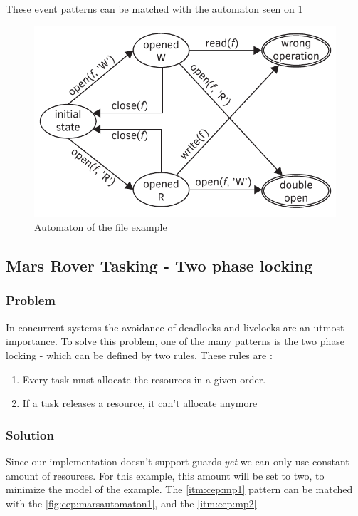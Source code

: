 				These event patterns can be matched with the automaton seen on \cref{fig:cep:fileautomaton}
				
				\begin{figure}[h]
				\centering
				\includegraphics[width=0.7\linewidth]{include/figures/chapter_5/file_example_aut}
				\caption{Automaton of the file example}
				\label{fig:cep:fileautomaton}
				\end{figure}

		
		
		\subsection{Mars Rover Tasking - Two phase locking}
			\subsubsection{Problem}
				In concurrent systems the avoidance of deadlocks and livelocks are an utmost importance.
				To solve this problem, one of the many patterns is  the two phase locking - which can be defined by two rules.
				These rules are : 
				\begin{enumerate}
					\item \label{itm:cep:mp1} Every task must allocate the resources in a given order.
					\item \label{itm:cep:mp2} If a task releases a resource, it can't allocate anymore
				\end{enumerate}
			\subsubsection{Solution}
				Since our implementation doesn't support guards \emph{yet} we can only use constant amount of resources.
				For this example, this amount will be set to two, to minimize the model of the example.
				The \cref{itm:cep:mp1} pattern can be matched with the \cref {fig:cep:marsautomaton1}, and the \cref{itm:cep:mp2} 


